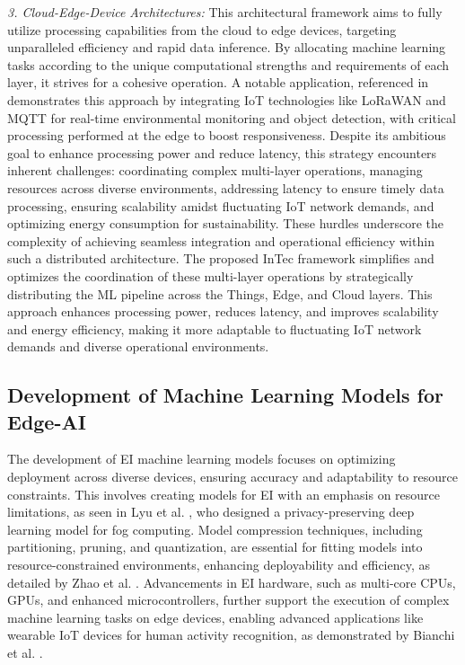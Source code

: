 \documentclass[11pt]{article}
\begin{document}
	
	\textit{3. Cloud-Edge-Device Architectures:} This architectural framework aims to fully utilize processing capabilities from the cloud to edge devices, targeting unparalleled efficiency and rapid data inference. By allocating machine learning tasks according to the unique computational strengths and requirements of each layer, it strives for a cohesive operation. A notable application, referenced in \cite{c31} demonstrates this approach by integrating IoT technologies like LoRaWAN and MQTT for real-time environmental
	monitoring and object detection, with critical processing performed at the edge
	to boost responsiveness. Despite its ambitious goal to enhance processing power
	and reduce latency, this strategy encounters inherent challenges: coordinating
	complex multi-layer operations, managing resources across diverse environments,
	addressing latency to ensure timely data processing, ensuring scalability amidst
	fluctuating IoT network demands, and optimizing energy consumption for sustainability. These hurdles underscore the complexity of achieving seamless integration and operational efficiency within such a distributed architecture. The proposed InTec framework simplifies and optimizes
	the coordination of these multi-layer operations by strategically distributing the
	ML pipeline across the Things, Edge, and Cloud layers. This approach enhances
	processing power, reduces latency, and improves scalability and energy efficiency,
	making it more adaptable to fluctuating IoT network demands and diverse operational environments.
	
	\subsection{Development of Machine Learning Models for Edge-AI} 
	The development of EI machine learning models focuses on optimizing deployment across diverse devices, ensuring accuracy and adaptability to resource constraints. This involves creating models for EI with an emphasis on resource limitations, as seen in Lyu et al. \cite{c38}, who designed a privacy-preserving deep learning model for fog computing. Model compression techniques, including partitioning, pruning, and quantization, are essential for fitting models into resource-constrained environments, enhancing deployability and efficiency, as detailed by Zhao et al. \cite{c26}. Advancements in EI hardware, such as multi-core CPUs, GPUs, and enhanced microcontrollers, further support the execution of complex machine learning tasks on edge devices, enabling advanced applications like wearable IoT devices for human activity recognition, as demonstrated by Bianchi et al. \cite{c36}.
	
\end{document}
